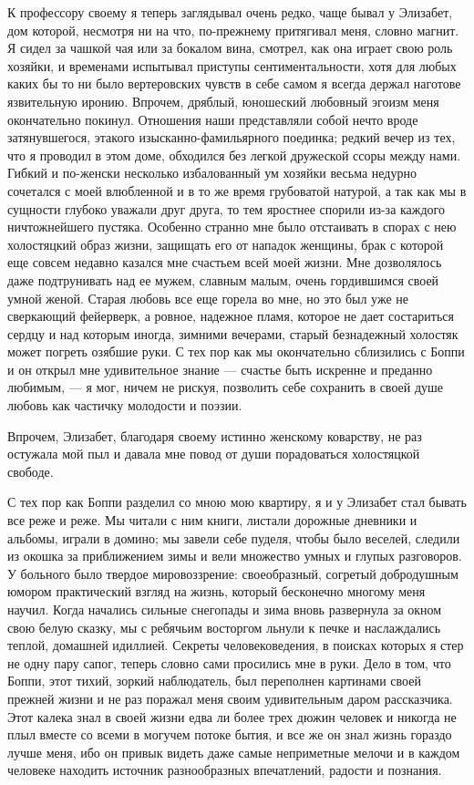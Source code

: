 К  профессору своему  я теперь  заглядывал очень  редко, чаще  бывал у
Элизабет,  дом которой,  несмотря  ни на  что, по-прежнему  притягивал
меня,  словно магнит.  Я  сидел за  чашкой чая  или  за бокалом  вина,
смотрел,  как она  играет  свою роль  хозяйки,  и временами  испытывал
приступы  сентиментальности,  хотя  для  любых каких  бы  то  ни  было
вертеровских чувств в себе самом  я всегда держал наготове язвительную
иронию. Впрочем, дряблый, юношеский  любовный эгоизм меня окончательно
покинул. Отношения наши представляли  собой нечто вроде затянувшегося,
этакого изысканно-фамильярного  поединка; редкий  вечер из тех,  что я
проводил в этом доме, обходился без легкой дружеской ссоры между нами.
Гибкий и  по-женски несколько  избалованный ум хозяйки  весьма недурно
сочетался с моей влюбленной и в  то же время грубоватой натурой, а так
как  мы  в  сущности  глубоко  уважали друг  друга,  то  тем  яростнее
спорили из-за каждого ничтожнейшего пустяка. Особенно странно мне было
отстаивать в  спорах с  нею холостяцкий образ  жизни, защищать  его от
нападок  женщины,  брак  с  которой еще  совсем  недавно  казался  мне
счастьем всей  моей жизни.  Мне дозволялось  даже подтрунивать  над ее
мужем,  славным малым,  очень  гордившимся своей  умной женой.  Старая
любовь все еще горела во мне,  но это был уже не сверкающий фейерверк,
а ровное,  надежное пламя,  которое не дает  состариться сердцу  и над
которым иногда,  зимними вечерами,  старый безнадежный  холостяк может
погреть озябшие руки. С тех пор как мы окончательно сблизились с Боппи
и  он открыл  мне  удивительное  знание ---  счастье  быть искренне  и
преданно любимым, --- я мог, ничем не рискуя, позволить себе сохранить
в своей душе любовь как частичку молодости и поэзии.

Впрочем, Элизабет, благодаря своему истинно женскому коварству, не раз
остужала мой пыл  и давала мне повод от  души порадоваться холостяцкой
свободе.

С тех пор как Боппи разделил со мною мою квартиру, я и у Элизабет стал
бывать  все реже  и  реже. Мы  читали с  ним  книги, листали  дорожные
дневники и альбомы, играли в домино; мы завели себе пуделя, чтобы было
веселей,  следили из  окошка  за приближением  зимы  и вели  множество
умных  и глупых  разговоров.  У больного  было твердое  мировоззрение:
своеобразный,  согретый  добродушным  юмором  практический  взгляд  на
жизнь, который бесконечно многому  меня научил. Когда начались сильные
снегопады и  зима вновь развернула  за окном  свою белую сказку,  мы с
ребячьим  восторгом льнули  к  печке и  наслаждались теплой,  домашней
идиллией. Секреты  человековедения, в поисках  которых я стер  не одну
пару сапог, теперь  словно сами просились мне в руки.  Дело в том, что
Боппи,  этот  тихий,  зоркий  наблюдатель,  был  переполнен  картинами
своей прежней  жизни и  не раз поражал  меня своим  удивительным даром
рассказчика. Этот калека  знал в своей жизни едва ли  более трех дюжин
человек и  никогда не плыл вместе  со всеми в могучем  потоке бытия, и
все же  он знал жизнь  гораздо лучше меня,  ибо он привык  видеть даже
самые  неприметные  мелочи  и  в  каждом  человеке  находить  источник
разнообразных впечатлений, радости и познания.

